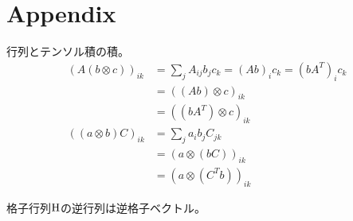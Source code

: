 \documentclass[11pt,a4paper,uplatex]{jsarticle}
\begin{document}
\section{Appendix}
行列とテンソル積の積。
\begin{align}
    \left( A \left(b \otimes c\right) \right)_{ik} &= \sum_{j} A_{ij} b_{j} c_{k}  
    = (Ab)_{i} c_{k} 
    = (b A^{T})_{i} c_{k} \\
    &= \left( (Ab) \otimes c \right)_{ik}\\
    &= \left( (bA^{T}) \otimes c \right)_{ik}\\
    \left( (a \otimes b) C\right)_{ik} &= \sum_{j} a_{i} b_{j} C_{jk} \\
    &= \left( a \otimes \left(b C\right)\right)_{ik} \\
    &= \left( a \otimes \left(C^{T} b \right)\right)_{ik}
\end{align}

格子行列${\rm H}$の逆行列は逆格子ベクトル。
    
\end{document}
